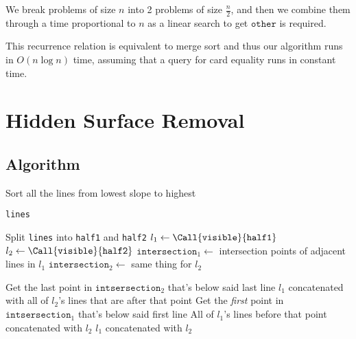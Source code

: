 \documentclass[12pt]{article}
\begin{document}
We break problems of size $n$ into 2 problems of size $\frac{n}{2}$,
and then we combine them through a time proportional to $n$
as a linear search to get $\texttt{other}$ is required.

This recurrence relation is equivalent to merge sort and
thus our algorithm runs in $\boxed{O(n \log n)}$ time, assuming
that a query for card equality runs in constant time.

\pagebreak

\section{Hidden Surface Removal}

\subsection{Algorithm}

\begin{algorithmic}[1]
    \State Sort all the lines from lowest slope to highest

    \item[]
            \State \Return \texttt{lines}
        \EndIf
    
        \item[]
        \State Split \texttt{lines} into \texttt{half1} and \texttt{half2}
        \State $l_1 \gets \Call{\texttt{visible}}{\texttt{half1}}$
        \State $l_2 \gets \Call{\texttt{visible}}{\texttt{half2}}$
        \State $\texttt{intersection}_1 \gets$ intersection points of adjacent lines in $l_1$
        \State $\texttt{intersection}_2 \gets$ same thing for $l_2$

        \item[]
            \State Get the last point in $\texttt{intsersection}_2$ that's below said last line
            \State \Return $l_1$ concatenated with all of $l_2$'s lines that are after that point
            \State Get the \textit{first} point in $\texttt{intsersection}_1$ that's below said first line
            \State \Return All of $l_1$'s lines before that point concatenated with $l_2$
        \Else
            \State \Return $l_1$ concatenated with $l_2$
        \EndIf
    \EndProcedure

    \item[]
    \State \Return {}
\end{algorithmic}
\end{document}
